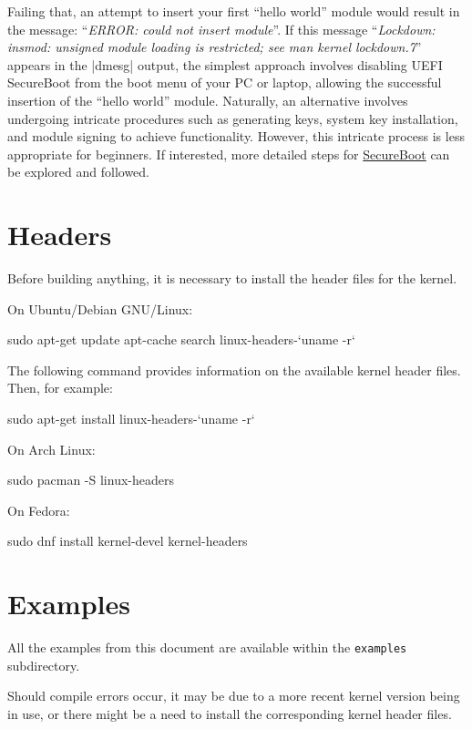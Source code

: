 \documentclass[10pt, oneside]{book}
\begin{document}
\begin{enumerate}
        Failing that, an attempt to insert your first ``hello world'' module would result in the message: ``\emph{ERROR: could not insert module}''.
        If this message ``\emph{Lockdown: insmod: unsigned module loading is restricted;
        see man kernel lockdown.7}'' appears in the \sh|dmesg| output,
        the simplest approach involves disabling UEFI SecureBoot from the boot menu of your PC or laptop,
        allowing the successful insertion of the ``hello world'' module.
        Naturally, an alternative involves undergoing intricate procedures such as generating keys, system key installation,
        and module signing to achieve functionality.
        However, this intricate process is less appropriate for beginners. If interested,
        more detailed steps for \href{https://wiki.debian.org/SecureBoot}{SecureBoot} can be explored and followed.
\end{enumerate}

\section{Headers}
\label{sec:headers}
Before building anything, it is necessary to install the header files for the kernel.

On Ubuntu/Debian GNU/Linux:
\begin{codebash}
sudo apt-get update
apt-cache search linux-headers-`uname -r`
\end{codebash}

The following command provides information on the available kernel header files.
Then, for example:
\begin{codebash}
sudo apt-get install linux-headers-`uname -r`
\end{codebash}

On Arch Linux:
\begin{codebash}
sudo pacman -S linux-headers
\end{codebash}

On Fedora:
\begin{codebash}
sudo dnf install kernel-devel kernel-headers
\end{codebash}

\section{Examples}
\label{sec:examples}
All the examples from this document are available within the \verb|examples| subdirectory.

Should compile errors occur, it may be due to a more recent kernel version being in use,
or there might be a need to install the corresponding kernel header files.
\end{document}
